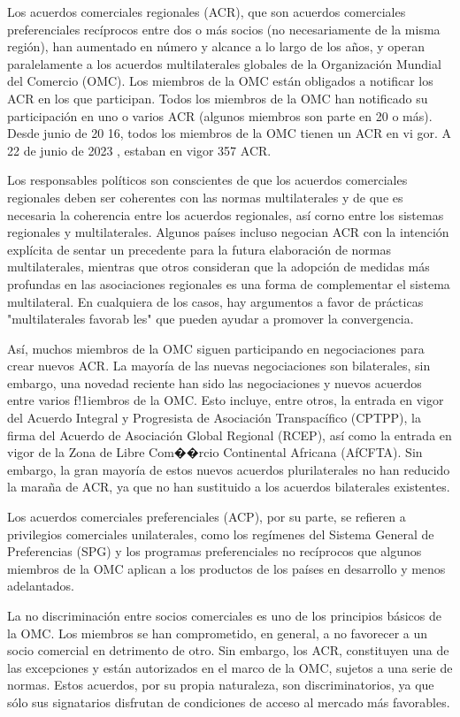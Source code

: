\documentclass[10pt,a4paper]{article}
\begin{document}
Los acuerdos comerciales regionales (ACR), que son acuerdos comerciales preferenciales recíprocos entre dos o más socios (no necesariamente de la misma región), han aumentado en número y alcance a lo largo de los años, y operan paralelamente a los acuerdos multilaterales globales de la Organización Mundial del Comercio (OMC). Los miembros de la OMC están obligados a notificar los ACR en los que participan. Todos los miembros de la OMC han notificado su participación en uno o varios ACR (algunos miembros son parte en 20 o más). Desde  junio de 20 16, todos los miembros de la OMC tienen un ACR en vi gor. A 22 de junio de 2023 , estaban en vigor 357 ACR. 

Los responsables políticos son conscientes de que los acuerdos comerciales regionales deben ser coherentes con las normas multilaterales y de que es necesaria la coherencia entre los acuerdos regionales, así corno entre los sistemas regionales y multilaterales. Algunos países incluso negocian ACR con la intención explícita de sentar un precedente para la futura elaboración de normas multilaterales, mientras que otros consideran que la adopción de medidas más profundas en las asociaciones regionales es una forma de complementar el sistema multilateral. En cualquiera de los casos, hay argumentos a favor de prácticas "multilaterales favorab les" que pueden ayudar a promover la convergencia.

Así, muchos miembros de la OMC siguen participando en negociaciones para crear nuevos ACR. La mayoría de las nuevas negociaciones son bilaterales, sin embargo, una novedad reciente han sido las negociaciones y nuevos acuerdos entre varios f!1iembros de la OMC. Esto incluye, entre otros, la entrada en vigor del Acuerdo Integral y Progresista de Asociación Transpacífico (CPTPP), la firma del Acuerdo de Asociación Global Regional (RCEP), así como la entrada en vigor de la Zona de Libre Com��rcio Continental Africana (AfCFTA). Sin embargo, la gran mayoría de estos nuevos acuerdos plurilaterales no han reducido la maraña de ACR, ya que no han sustituido a los acuerdos bilaterales existentes.

Los acuerdos comerciales preferenciales (ACP), por su parte, se refieren a privilegios comerciales unilaterales, como los regímenes del Sistema General de Preferencias (SPG) y los programas preferenciales no recíprocos que algunos miembros de la OMC aplican a los productos de los países en desarrollo y menos adelantados.

La no discriminación entre socios comerciales es uno de los principios básicos de la OMC. Los miembros se han comprometido, en general, a no favorecer a un socio comercial en detrimento de otro. Sin embargo, los ACR, constituyen una de las excepciones y están autorizados en el marco de la OMC, sujetos a una serie de normas. Estos acuerdos, por su propia naturaleza, son discriminatorios, ya que sólo sus signatarios disfrutan de condiciones de acceso al mercado más favorables. 
\end{document}
